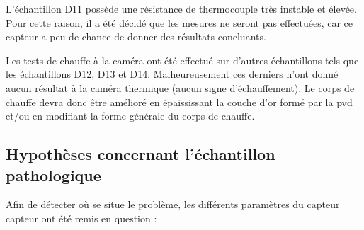 L'échantillon D11 possède une résistance de thermocouple très instable et élevée. Pour cette raison, il a été décidé que les mesures ne seront 
pas effectuées, car ce capteur a peu de chance de donner des résultats concluants. 

Les tests de chauffe à la caméra ont été effectué sur d'autres échantillons tels que les échantillons D12, D13 et D14. Malheureusement ces derniers 
n'ont donné aucun résultat à la caméra thermique (aucun signe d'échauffement). Le corps de chauffe devra donc être amélioré en épaississant la 
couche d'or formé par la \gls{pvd} et/ou en modifiant la forme générale du corps de chauffe. 

\subsection{Hypothèses concernant l'échantillon pathologique}
Afin de détecter où se situe le problème, les différents paramètres du capteur \gls{capteur} ont été remis en question :
